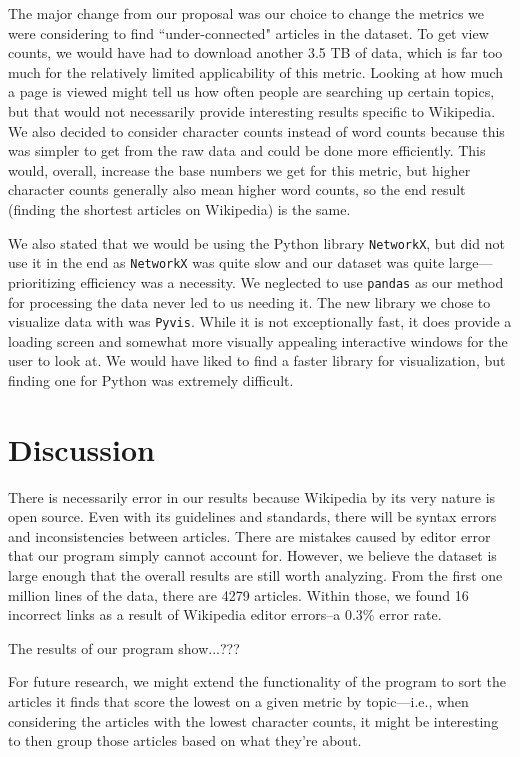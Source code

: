 \documentclass[fontsize=12pt]{article}
\begin{document}
\begin{multicols}{2}
    The major change from our proposal was our choice to change the metrics we were considering to find ``under-connected" articles in the dataset. To get view counts, we would have had to download another 3.5 TB of data, which is far too much for the relatively limited applicability of this metric. Looking at how much a page is viewed might tell us how often people are searching up certain topics, but that would not necessarily provide interesting results specific to Wikipedia. We also decided to consider character counts instead of word counts because this was simpler to get from the raw data and could be done more efficiently. This would, overall, increase the base numbers we get for this metric, but higher character counts generally also mean higher word counts, so the end result (finding the shortest articles on Wikipedia) is the same.
    
    We also stated that we would be using the Python library \texttt{NetworkX}, but did not use it in the end as \texttt{NetworkX} was quite slow and our dataset was quite large---prioritizing efficiency was a necessity. We neglected to use \texttt{pandas} as our method for processing the data never led to us needing it. The new library we chose to visualize data with was \texttt{Pyvis}. While it is not exceptionally fast, it does provide a loading screen and somewhat more visually appealing interactive windows for the user to look at. We would have liked to find a faster library for visualization, but finding one for Python was extremely difficult.
    
    \section{Discussion}
    There is necessarily error in our results because Wikipedia by its very nature is open source. Even with its guidelines and standards, there will be syntax errors and inconsistencies between articles. There are mistakes caused by editor error that our program simply cannot account for. However, we believe the dataset is large enough that the overall results are still worth analyzing. From the first one million lines of the data, there are 4279 articles. Within those, we found 16 incorrect links as a result of Wikipedia editor errors--a 0.3\% error rate.
    
    
    The results of our program show...???
    
    For future research, we might extend the functionality of the program to sort the articles it finds that score the lowest on a given metric by topic---i.e., when considering the articles with the lowest character counts, it might be interesting to then group those articles based on what they're about. %
    

\end{multicols}

\linespread{2}
\newpage
\nocite{*}
\printbibliography[title={\centering References}]
\end{document}
